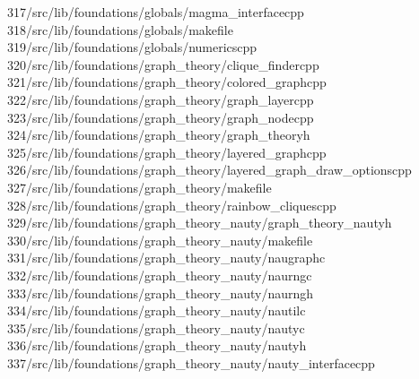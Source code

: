 \begin{tabbing}
317\>/src/lib/foundations/globals/magma\_interfacecpp\\[0pt]
318\>/src/lib/foundations/globals/makefile\\[0pt]
319\>/src/lib/foundations/globals/numericscpp\\[0pt]
320\>/src/lib/foundations/graph\_theory/clique\_findercpp\\[0pt]
321\>/src/lib/foundations/graph\_theory/colored\_graphcpp\\[0pt]
322\>/src/lib/foundations/graph\_theory/graph\_layercpp\\[0pt]
323\>/src/lib/foundations/graph\_theory/graph\_nodecpp\\[0pt]
324\>/src/lib/foundations/graph\_theory/graph\_theoryh\\[0pt]
325\>/src/lib/foundations/graph\_theory/layered\_graphcpp\\[0pt]
326\>/src/lib/foundations/graph\_theory/layered\_graph\_draw\_optionscpp\\[0pt]
327\>/src/lib/foundations/graph\_theory/makefile\\[0pt]
328\>/src/lib/foundations/graph\_theory/rainbow\_cliquescpp\\[0pt]
329\>/src/lib/foundations/graph\_theory\_nauty/graph\_theory\_nautyh\\[0pt]
330\>/src/lib/foundations/graph\_theory\_nauty/makefile\\[0pt]
331\>/src/lib/foundations/graph\_theory\_nauty/naugraphc\\[0pt]
332\>/src/lib/foundations/graph\_theory\_nauty/naurngc\\[0pt]
333\>/src/lib/foundations/graph\_theory\_nauty/naurngh\\[0pt]
334\>/src/lib/foundations/graph\_theory\_nauty/nautilc\\[0pt]
335\>/src/lib/foundations/graph\_theory\_nauty/nautyc\\[0pt]
336\>/src/lib/foundations/graph\_theory\_nauty/nautyh\\[0pt]
337\>/src/lib/foundations/graph\_theory\_nauty/nauty\_interfacecpp\\[0pt]

\end{tabbing}
